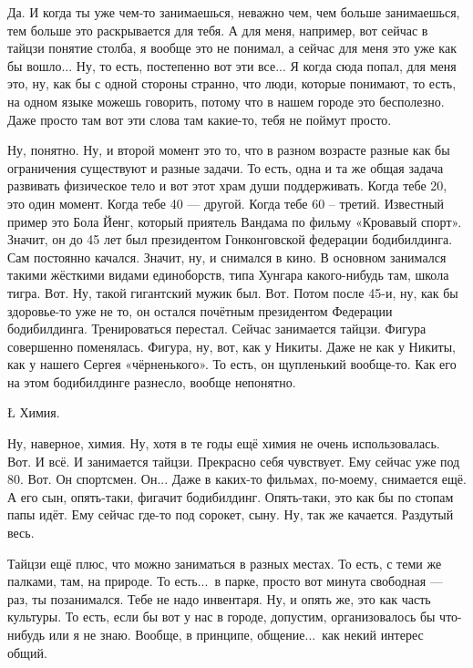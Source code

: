 \I
Да. И когда ты уже
чем-то занимаешься, неважно чем,
чем больше занимаешься, тем больше
это раскрывается для тебя.
А для меня, например,
вот сейчас в тайцзи
понятие столба, я вообще
это не понимал, а сейчас для меня
это уже как бы вошло... Ну, то есть,
постепенно вот эти все...
Я когда сюда попал, для меня это,
ну, как бы с одной стороны странно,
что люди, которые
понимают, то есть, на
одном языке можешь говорить,
потому что в нашем городе это бесполезно.
Даже просто там вот эти слова
там какие-то, тебя не поймут просто.

\A
Ну, понятно.
Ну, и второй момент это то, что
в разном возрасте разные
как бы ограничения
существуют и разные задачи.
То есть, одна и та же
общая задача
развивать физическое
тело и вот этот храм души
поддерживать.
Когда тебе
20, это
один момент. Когда тебе 40 --- другой.
Когда тебе 60 -- третий.
Известный пример это
Бола Йенг, который
приятель
Вандама по фильму
«Кровавый спорт». Значит,
он до
45 лет
был президентом
Гонконговской федерации бодибилдинга.
Сам постоянно качался.
Значит,
ну, и снимался в кино.
В основном занимался
такими жёсткими видами
единоборств, типа Хунгара
какого-нибудь там, школа тигра.
Вот.
Ну, такой гигантский мужик был.
Вот. Потом
после 45-и,
ну, как бы здоровье-то уже не то,
он
остался почётным
президентом
Федерации бодибилдинга. Тренироваться
перестал. Сейчас
занимается тайцзи.
Фигура совершенно поменялась. Фигура,
ну, вот, как у Никиты.
Даже не как у Никиты,
как у нашего
Сергея «чёрненького».
То есть, он щупленький вообще-то.
Как его на этом бодибилдинге разнесло,
вообще непонятно.

\L
Химия.

\A
Ну, наверное,
химия. Ну, хотя в те годы
ещё химия не очень использовалась.
Вот. И всё. И занимается тайцзи.
Прекрасно себя чувствует. Ему сейчас уже
под 80. Вот. Он спортсмен.
Он... Даже в каких-то фильмах, по-моему, снимается ещё.
А его сын, опять-таки,
фигачит бодибилдинг.
Опять-таки, это как бы
по стопам папы идёт.
Ему сейчас где-то под
сорокет, сыну.
Ну, так же качается.
Раздутый весь.

\I
Тайцзи ещё плюс, что можно заниматься
в разных местах. То есть,
с теми же палками, там,
на природе. То есть...\
в парке, просто вот
минута свободная --- раз, ты позанимался.
Тебе не надо инвентаря.
Ну, и опять же, это как часть
культуры. То есть, если бы
вот у нас в городе, допустим,
организовалось бы что-нибудь или я не знаю.
Вообще, в принципе, общение...\
как некий интерес общий.

